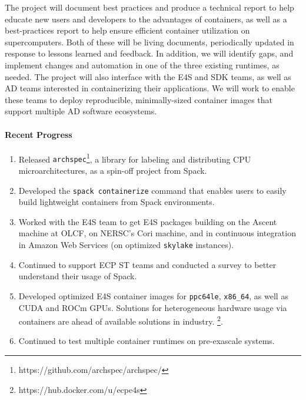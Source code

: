 The project will document best practices and produce a technical report
to help educate new users and developers to the advantages of containers,
as well as a best-practices report to help ensure efficient container
utilization on supercomputers. Both of these will be living
documents, periodically updated in response to lessons learned and
feedback.  In addition, we will identify gaps, and implement changes and
automation in one of the three existing runtimes, as needed.  The project
will also interface with the E4S and SDK teams, as well as AD teams
interested in containerizing their applications. We will work to enable
these teams to deploy reproducible, minimally-sized container images that
support multiple AD software ecosystems.

\paragraph{Recent Progress}

\begin{enumerate}
\item Released {\tt archspec}\footnote{https://github.com/archspec/archspec/},
      a library for labeling and distributing CPU microarchitectures, as a
      spin-off project from Spack.

\item Developed the {\tt spack containerize} command that enables users to
      easily build lightweight containers from Spack environments.

\item Worked with the E4S team to get E4S packages building on the Ascent
      machine at OLCF, on NERSC's Cori machine, and in continuous integration in
      Amazon Web Services (on optimized {\tt skylake} instances).

\item Continued to support ECP ST teams and conducted a survey to better
      understand their usage of Spack.

\item Developed optimized E4S container images for {\tt ppc64le},
      {\tt x86\_64}, as well as CUDA and ROCm GPUs. Solutions for
      heterogeneous hardware usage via containers are ahead of available
      solutions in industry. \footnote{https://hub.docker.com/u/ecpe4s}.

\item Continued to test multiple container runtimes on pre-exascale systems.
\end{enumerate}

